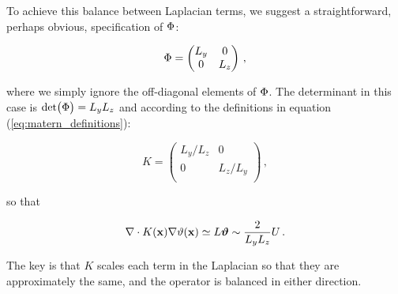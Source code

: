 To achieve this balance between Laplacian terms, we suggest a straightforward,
perhaps obvious, specification of $\Phi$:
\begin{linenomath*}\begin{equation*}
    \Phi =
        \begin{pmatrix}
            L_y & 0     \\
            0   & L_z   \\
        \end{pmatrix} \, ,
\end{equation*}\end{linenomath*}
where we simply ignore the off-diagonal elements of $\Phi$.
The determinant in this case is $\text{det}\big(\Phi\big) = L_yL_z$ and
according to the definitions in equation (\ref{eq:matern_definitions}):
\begin{linenomath*}\begin{equation*}
    K =
        \begin{pmatrix}
            L_y/L_z & 0     \\
            0   & L_z/L_y   \\
        \end{pmatrix} \, ,
\end{equation*}\end{linenomath*}
so that
\begin{linenomath*}\begin{equation*}
    \nabla\cdot K(\mathbf{x})\nabla\vartheta(\mathbf{x}) \simeq L\bm{\vartheta}  \sim \dfrac{2}{L_yL_z}U \, .
\end{equation*}\end{linenomath*}
The key is that $K$ scales each term in the Laplacian so that they are
approximately the same, and the operator is balanced in either direction.\\

